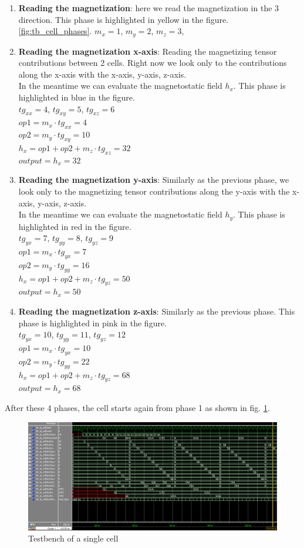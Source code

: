 \begin{enumerate}
	\item \textbf{Reading the magnetization}: here we read the magnetization in the 3 direction. 
	This phase is highlighted in yellow in the figure.\\ \ref{fig:tb_cell_phases}.
	$ m_x=1 $, $ m_y=2 $, $ m_z=3 $, 
	\item \textbf{Reading the magnetization x-axis}: Reading the magnetizing tensor contributions between 2 cells. Right now we look only to the contributions along the x-axis with the x-axis, y-axis, z-axis.\\In the meantime we can evaluate the magnetostatic field $ h_{x} $.
	This phase is highlighted in blue in the figure.\\
	$ tg_{xx}=4 $, $ tg_{xy}=5 $, $ tg_{xz}=6 $\\
	$ op1=m_x \cdot tg_{xx}=4 $\\
	$ op2=m_y \cdot tg_{xy}=10 $\\
	$ h_x=op1+op2+m_z \cdot tg_{xz}=32$\\
	$ output=h_x=32$
	\item \textbf{Reading the magnetization y-axis}: Similarly as the previous phase, we look only to the magnetizing tensor contributions along the y-axis with the x-axis, y-axis, z-axis.\\In the meantime we can evaluate the magnetostatic field $ h_{y} $.
	This phase is highlighted in red in the figure.\\
	$ tg_{yx}=7 $, $ tg_{yy}=8 $, $ tg_{yz}=9 $\\
	$ op1=m_x \cdot tg_{yx}=7 $\\
	$ op2=m_y \cdot tg_{yy}=16 $\\
	$ h_x=op1+op2+m_z \cdot tg_{yz}=50$\\
	$ output=h_x=50$
	\item \textbf{Reading the magnetization z-axis}: Similarly as the previous phase.
	This phase is highlighted in pink in the figure.\\
	$ tg_{yx}=10 $, $ tg_{yy}=11 $, $ tg_{yz}=12 $\\
	$ op1=m_x \cdot tg_{yx}=10 $\\
	$ op2=m_y \cdot tg_{yy}=22 $\\
	$ h_x=op1+op2+m_z \cdot tg_{yz}=68$\\
	$ output=h_x=68$
\end{enumerate}
After these 4 phases, the cell starts again from phase 1 as shown in fig. \ref{fig:tb_cell}.
\begin{figure}[h]
	\centering
	\includegraphics[width=\textwidth]{imm/3d/tb_cell.png}  
	\caption{Testbench of a single cell}
	\label{fig:tb_cell}
\end{figure}
